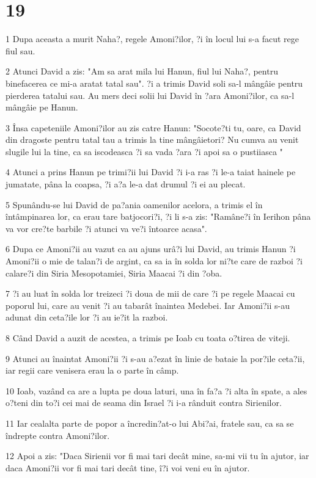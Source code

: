 \chapter{19}

\par 1 Dupa aceasta a murit Naha?, regele Amoni?ilor, ?i în locul lui s-a facut rege fiul sau.
\par 2 Atunci David a zis: "Am sa arat mila lui Hanun, fiul lui Naha?, pentru binefacerea ce mi-a aratat tatal sau". ?i a trimis David soli sa-l mângâie pentru pierderea tatalui sau. Au mers deci solii lui David în ?ara Amoni?ilor, ca sa-l mângâie pe Hanun.
\par 3 Însa capeteniile Amoni?ilor au zis catre Hanun: "Socote?ti tu, oare, ca David din dragoste pentru tatal tau a trimis la tine mângâietori? Nu cumva au venit slugile lui la tine, ca sa iscodeasca ?i sa vada ?ara ?i apoi sa o pustiiasca "
\par 4 Atunci a prins Hanun pe trimi?ii lui David ?i i-a ras ?i le-a taiat hainele pe jumatate, pâna la coapsa, ?i a?a le-a dat drumul ?i ei au plecat.
\par 5 Spunându-se lui David de pa?ania oamenilor acelora, a trimis el în întâmpinarea lor, ca erau tare batjocori?i, ?i li s-a zis: "Ramâne?i în Ierihon pâna va vor cre?te barbile ?i atunci va ve?i întoarce acasa".
\par 6 Dupa ce Amoni?ii au vazut ca au ajuns urâ?i lui David, au trimis Hanun ?i Amoni?ii o mie de talan?i de argint, ca sa ia în solda lor ni?te care de razboi ?i calare?i din Siria Mesopotamiei, Siria Maacai ?i din ?oba.
\par 7 ?i au luat în solda lor treizeci ?i doua de mii de care ?i pe regele Maacai cu poporul lui, care au venit ?i au tabarât înaintea Medebei. Iar Amoni?ii s-au adunat din ceta?ile lor ?i au ie?it la razboi.
\par 8 Când David a auzit de acestea, a trimis pe Ioab cu toata o?tirea de viteji.
\par 9 Atunci au înaintat Amoni?ii ?i s-au a?ezat în linie de bataie la por?ile ceta?ii, iar regii care venisera erau la o parte în câmp.
\par 10 Ioab, vazând ca are a lupta pe doua laturi, una în fa?a ?i alta în spate, a ales o?teni din to?i cei mai de seama din Israel ?i i-a rânduit contra Sirienilor.
\par 11 Iar cealalta parte de popor a încredin?at-o lui Abi?ai, fratele sau, ca sa se îndrepte contra Amoni?ilor.
\par 12 Apoi a zis: "Daca Sirienii vor fi mai tari decât mine, sa-mi vii tu în ajutor, iar daca Amoni?ii vor fi mai tari decât tine, î?i voi veni eu în ajutor.
